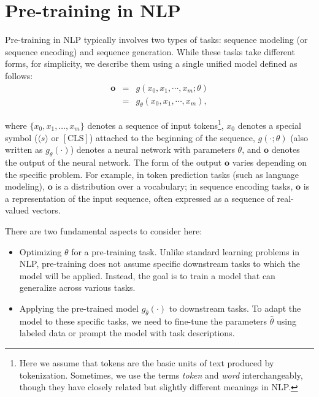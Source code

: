 \section{Pre-training in NLP}

\noindent Pre-training in NLP typically involves two types of tasks: sequence modeling (or sequence encoding) and sequence generation. While these tasks take different forms, for simplicity, we describe them using a single unified model defined as follows:
\begin{eqnarray}
\mathbf{o} & = & g(x_0,x_1,\cdots,x_m;\theta) \nonumber \\
           & = & g_{\theta}(x_0,x_1,\cdots,x_m),
\end{eqnarray}

\noindent where $\{x_0, x_1, \dots, x_m\}$ denotes a sequence of input tokens\footnote{Here we assume that tokens are the basic units of text produced by tokenization. Sometimes, we use the terms \textit{token} and \textit{word} interchangeably, though they have closely related but slightly different meanings in NLP.}, $x_0$ denotes a special symbol ($\langle s \rangle$ or $\mathbf{[\mathrm{CLS}]}$) attached to the beginning of the sequence, $g(\cdot;\theta)$ (also written as $g_{\theta}(\cdot)$) denotes a neural network with parameters $\theta$, and $\mathbf{o}$ denotes the output of the neural network. The form of the output $\mathbf{o}$ varies depending on the specific problem. For example, in token prediction tasks (such as language modeling), $\mathbf{o}$ is a distribution over a vocabulary; in sequence encoding tasks, $\mathbf{o}$ is a representation of the input sequence, often expressed as a sequence of real-valued vectors.

There are two fundamental aspects to consider here:

\begin{itemize}
\item \vspace{0.5em} Optimizing $\theta$ for a pre-training task. Unlike standard learning problems in NLP, pre-training does not assume specific downstream tasks to which the model will be applied. Instead, the goal is to train a model that can generalize across various tasks.
\item \vspace{0.3em} Applying the pre-trained model $g_{\hat{\theta}}(\cdot)$ to downstream tasks. To adapt the model to these specific tasks, we need to fine-tune the parameters $\hat{\theta}$ using labeled data or prompt the model with task descriptions.
\end{itemize}
\vspace{0.5em}

